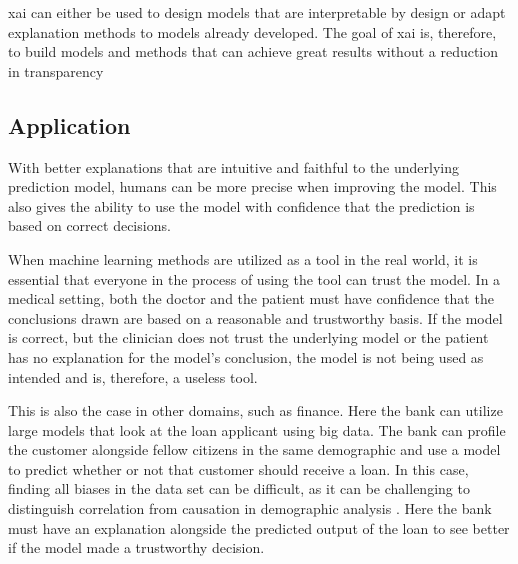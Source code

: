 \gls{xai} can either be used to design models that are interpretable by design or adapt explanation methods to models already developed. 
The goal of \gls{xai} is, therefore, to build models and methods that can achieve great results without a reduction in transparency





\subsection{Application}

With better explanations that are intuitive and faithful to the underlying prediction model, humans can be more precise when improving the model. This also gives the ability to use the model with confidence that the prediction is based on correct decisions.


When machine learning methods are utilized as a tool in the real world, it is essential that everyone in the process of using the tool can trust the model. 
In a medical setting, both the doctor and the patient must have confidence that the conclusions drawn are based on a reasonable and trustworthy basis. If the model is correct, but the clinician does not trust the underlying model or the patient has no explanation for the model's conclusion, the model is not being used as intended and is, therefore, a useless tool.

This is also the case in other domains, such as finance. Here the bank can utilize large models that look at the loan applicant using big data. The bank can profile the customer alongside fellow citizens in the same demographic and use a model to predict whether or not that customer should receive a loan. In this case, finding all biases in the data set can be difficult, as it can be challenging to distinguish correlation from causation in demographic analysis \cite{garciaHarmsDemographicBias2019}. Here the bank must have an explanation alongside the predicted output of the loan to see better if the model made a trustworthy decision. 




